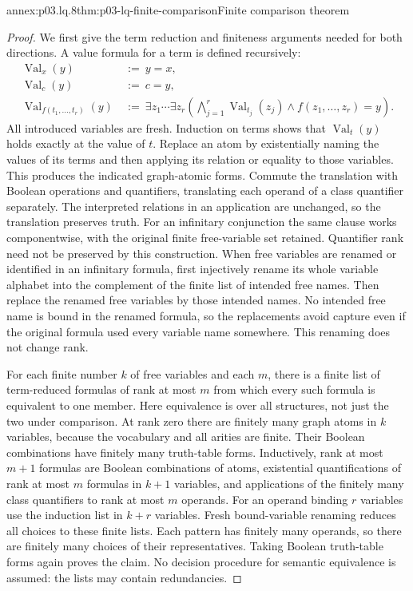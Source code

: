 \begin{annexitem}{annex:p03.lq.8}{thm:p03-lq-finite-comparison}{Finite comparison theorem}
\begin{proof}
We first give the term reduction and finiteness arguments needed for
both directions. A value formula for a term is defined recursively:
\[
\begin{aligned}
 \operatorname{Val}_x(y)&\ :=\ y=x,\\
 \operatorname{Val}_c(y)&\ :=\ c=y,\\
 \operatorname{Val}_{f(t_1,\ldots,t_r)}(y)
   &\ :=\ \exists z_1\cdots\exists z_r
       \left(\bigwedge_{j=1}^r\operatorname{Val}_{t_j}(z_j)
                    \land f(z_1,\ldots,z_r)=y\right).
\end{aligned}
\]
All introduced variables are fresh. Induction on terms shows that
\(\operatorname{Val}_t(y)\) holds exactly at the value of \(t\).
Replace an atom by existentially naming the values of its terms and
then applying its relation or equality to those variables. This
produces the indicated graph-atomic forms. Commute the translation
with Boolean operations and quantifiers, translating each operand
of a class quantifier separately. The interpreted relations in an
application are unchanged, so the translation preserves truth.
For an infinitary conjunction the same clause works componentwise,
with the original finite free-variable set retained. Quantifier
rank need not be preserved by this construction. When free variables
are renamed or identified in an infinitary formula, first injectively
rename its whole variable alphabet into the complement of the finite
list of intended free names. Then replace the renamed free variables
by those intended names. No intended free name is bound in the renamed
formula, so the replacements avoid capture even if the original formula
used every variable name somewhere. This renaming does not change rank.

For each finite number \(k\) of free variables and each \(m\),
there is a finite list of term-reduced formulas of rank at most
\(m\) from which every such formula is equivalent to one member.
Here equivalence is over all structures, not just the two under
comparison. At rank zero there are finitely many graph atoms in
\(k\) variables, because the vocabulary and all arities are finite.
Their Boolean combinations have finitely many truth-table forms.
Inductively, rank at most \(m+1\) formulas are Boolean combinations
of atoms, existential quantifications of rank at most \(m\)
formulas in \(k+1\) variables, and applications of the finitely
many class quantifiers to rank at most \(m\) operands. For an
operand binding \(r\) variables use the induction list in
\(k+r\) variables. Fresh bound-variable renaming reduces all
choices to these finite lists. Each pattern has finitely many
operands, so there are finitely many choices of their representatives.
Taking Boolean truth-table forms again proves the claim. No
decision procedure for semantic equivalence is assumed: the lists
may contain redundancies.


\end{proof}
\end{annexitem}
